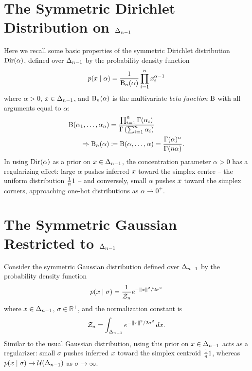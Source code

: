 \section{The Symmetric Dirichlet Distribution on \texorpdfstring{$\Delta_{n-1}$}{DeltaNMinusOne}}\label{sec:supp:dirichlet_distbn}

Here we recall some basic properties of the symmetric Dirichlet distribution $\Dir{\alpha}$, defined over $\Delta_{n-1}$ by the probability density function
\begin{align}\label{eqn:supp:dirichlet_pdf}
    p(x \mid \alpha) = \frac{1}{\mathrm{B}_{n}(\alpha)} \prod_{i=1}^{n} x_i^{\alpha - 1}
\end{align}
where $\alpha > 0$, $x \in \Delta_{n-1}$, and $\mathrm{B}_{n}(\alpha)$ is the multivariate \textit{beta function} $\mathrm{B}$ with all arguments equal to $\alpha$:
\begin{align*}
    \mathrm{B}(\alpha_1, \ldots, \alpha_n) & = \frac{\prod_{i=1}^{n} \Gamma(\alpha_i)}{\Gamma\left(\sum_{i=1}^{n} \alpha_i\right)}  \\
    \Rightarrow \mathrm{B}_{n}(\alpha)     & \coloneqq \mathrm{B}(\alpha, \ldots, \alpha) = \frac{\Gamma(\alpha)^{n}}{\Gamma(n \alpha)}.
\end{align*}
In using $\Dir{\alpha}$ as a prior on $x \in \Delta_{n-1}$, the concentration parameter $\alpha > 0$ has a regularizing effect: large $\alpha$ pushes inferred $x$ toward the simplex centre -- the uniform distribution $\frac{1}{n} \mathrm{1}$ -- and conversely, small $\alpha$ pushes $x$ toward the simplex corners, approaching one-hot distributions as $\alpha \to 0^+$.

\section{The Symmetric Gaussian Restricted to \texorpdfstring{$\Delta_{n-1}$}{DeltaNMinusOne}}\label{sec:supp:gauss_distbn}

Consider the symmetric Gaussian distribution defined over $\Delta_{n-1}$ by the probability density function
\begin{align}\label{eqn:supp:gauss_pdf_simplex}
    p(x \mid \sigma) = \frac{1}{\mathcal{Z}_n} e^{ -\lVert x \rVert^2 / 2 \sigma^2 }
\end{align}
where $x \in \Delta_{n-1}$, $\sigma \in \mathbb{R}^+$, and the normalization constant is
\begin{align}\label{eqn:supp:gauss_pdf_norm}
    \mathcal{Z}_n = \int_{\Delta_{n-1}} e^{ -\lVert x \rVert^2 / 2 \sigma^2 } \, dx.
\end{align}
Similar to the usual Gaussian distribution, using this prior on $x \in \Delta_{n-1}$ acts as a regularizer: small $\sigma$ pushes inferred $x$ toward the simplex centroid $\frac{1}{n} \mathrm{1}$, whereas $p(x \mid \sigma) \to \mathcal{U}(\Delta_{n-1})$ as $\sigma \to \infty$.

